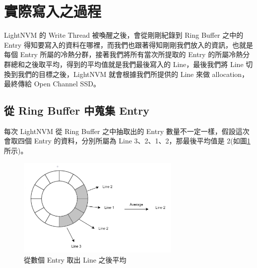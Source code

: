 \section{實際寫入之過程}\label{s3.3}
\indent
LightNVM 的 Write Thread 被喚醒之後，會從剛剛紀錄到 Ring Buffer 之中的 Entry 得知要寫入的資料在哪裡，而我們也跟著得知剛剛我們放入的資訊，也就是每個 Entry 所屬的冷熱分群，接著我們將所有當次所提取的 Entry 的所屬冷熱分群總和之後取平均，得到的平均值就是我們最後寫入的 Line，最後我們將 Line 切換到我們的目標之後，LightNVM 就會根據我們所提供的 Line 來做 allocation，最終傳給 Open Channel SSD。

\subsection{從 Ring Buffer 中蒐集 Entry}\label{s3.3.1}
\indent
每次 LightNVM 從 Ring Buffer 之中抽取出的 Entry 數量不一定一樣，假設這次會取四個 Entry 的資料，分別所屬為 Line 3、2、1、2，那最後平均值是 2(如圖\ref{f3.9}所示)。

\begin{figure}[H]
    \centering
    \includegraphics[width=0.7\textwidth]{picture/ch3/get_entry_from_ring_buffer.png}
    \caption{從數個 Entry 取出 Line 之後平均}
    \label{f3.9}
\end{figure}

